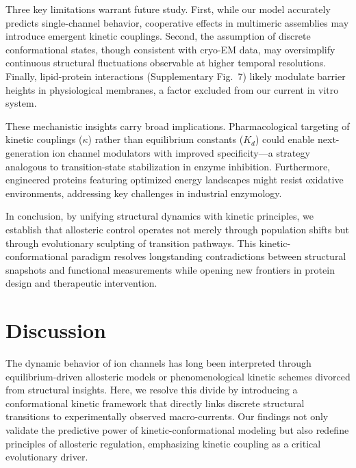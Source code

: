 \documentclass[pdflatex,sn-mathphys-num]{sn-jnl}%
\theoremstyle{thmstyleone}%
\theoremstyle{thmstyletwo}%
\theoremstyle{thmstylethree}%
\begin{document}
Three key limitations warrant future study. First, while our model accurately predicts single-channel behavior, cooperative effects in multimeric assemblies may introduce emergent kinetic couplings. Second, the assumption of discrete conformational states, though consistent with cryo-EM data, may oversimplify continuous structural fluctuations observable at higher temporal resolutions. Finally, lipid-protein interactions (Supplementary Fig.~7) likely modulate barrier heights in physiological membranes, a factor excluded from our current in vitro system.  

These mechanistic insights carry broad implications. Pharmacological targeting of kinetic couplings ($\kappa$) rather than equilibrium constants ($K_d$) could enable next-generation ion channel modulators with improved specificity—a strategy analogous to transition-state stabilization in enzyme inhibition. Furthermore, engineered proteins featuring optimized energy landscapes might resist oxidative environments, addressing key challenges in industrial enzymology.  

In conclusion, by unifying structural dynamics with kinetic principles, we establish that allosteric control operates not merely through population shifts but through evolutionary sculpting of transition pathways. This kinetic-conformational paradigm resolves longstanding contradictions between structural snapshots and functional measurements while opening new frontiers in protein design and therapeutic intervention.  

\section{Discussion}
The dynamic behavior of ion channels has long been interpreted through equilibrium-driven allosteric models or phenomenological kinetic schemes divorced from structural insights. Here, we resolve this divide by introducing a conformational kinetic framework that directly links discrete structural transitions to experimentally observed macro-currents. Our findings not only validate the predictive power of kinetic-conformational modeling but also redefine principles of allosteric regulation, emphasizing kinetic coupling as a critical evolutionary driver.  

\end{document}
